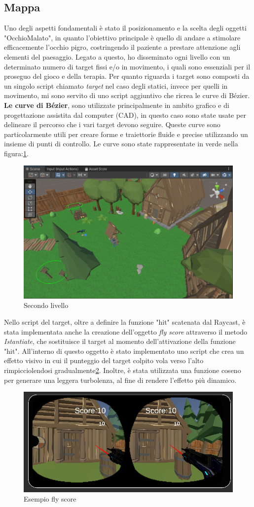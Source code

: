 \documentclass[
a4paper,
cleardoublepage=empty,
headings=twolinechapter,
numbers=autoenddot,
]{scrbook}
\begin{document}
    \subsection{Mappa}
    Uno degli aspetti fondamentali è stato il posizionamento e la scelta degli oggetti "OcchioMalato", in quanto l'obiettivo principale è quello di andare a stimolare efficacemente l'occhio pigro, costringendo il paziente a prestare attenzione agli elementi del paesaggio.
    Legato a questo, ho disseminato ogni livello con un determinato numero di target fissi e/o in movimento, i quali sono essenziali per il proseguo del gioco e della terapia.
    Per quanto riguarda i target sono composti da un singolo script chiamato \textit{target} nel caso degli statici, invece per quelli in movimento, mi sono servito di uno script aggiuntivo che ricrea le curve di Bézier\cite{Pack_asset}.
    \textbf{Le curve di Bézier}\cite{Path_asset}, sono utilizzate principalmente in ambito grafico e di progettazione assistita dal computer (CAD), in questo caso sono state usate per delineare il percorso che i vari target devono seguire. Queste curve sono particolarmente utili per creare forme e traiettorie fluide e precise utilizzando un insieme di punti di controllo.
    Le curve sono state rappresentate in verde nella figura:\ref{fig:mappa}.
     \begin{figure}[H]
    	\centering
    	\includegraphics[width=0.6\linewidth]{image/mappa}
    	\caption{Secondo livello}
    	\label{fig:mappa}
    \end{figure}
    Nello script del target, oltre a definire la funzione "hit" scatenata dal Raycast, è stata implementata anche la creazione dell'oggetto \textit{fly score} attraverso il metodo \textit{Istantiate}, che sostituisce il target al momento dell'attivazione della funzione "hit". All'interno di questo oggetto è stato implementato uno script che crea un effetto visivo in cui il punteggio del target colpito vola verso l'alto rimpicciolendosi gradualmente\ref{fig:fly score}. Inoltre, è stata utilizzata una funzione coseno per generare una leggera turbolenza, al fine di rendere l'effetto più dinamico.
     \begin{figure}[H]
    	\centering
    	\includegraphics[width=0.6\linewidth]{image/fly score}
    	\caption{Esempio fly score}
    	\label{fig:fly score}
    \end{figure}
\end{document}

